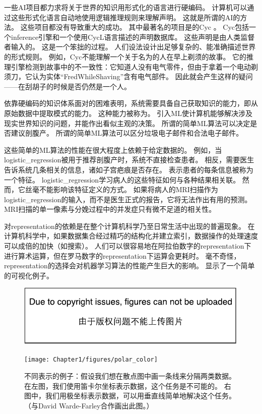 一些\gls{AI}项目都力求将关于世界的知识用形式化的语言进行硬编码。
计算机可以通过这些形式化语言自动地使用逻辑推理规则来理解声明。
这就是所谓的\gls{AI}的方法。
这些项目都没有导致重大的成功。
其中最著名的项目是的Cyc \citep{Lenat-1989-book}。
Cyc包括一个\gls{inference}引擎和一个使用CycL语言描述的声明数据库。
这些声明是由人类监督者输入的。
这是一个笨拙的过程。
人们设法设计出足够复杂的、能准确描述世界的形式规则。
例如，Cyc不能理解一个关于名为的人在早上剃须的故事\citep{MachineChangedWorld}。
它的推理引擎检测到故事中的不一致性：它知道人没有电气零件，但由于拿着一个电动剃须刀，它认为实体``FredWhileShaving''含有电气部件。
因此就会产生这样的疑问——在刮胡子的时候是否仍然是一个人。

依靠硬编码的知识体系面对的困难表明，系统需要具备自己获取知识的能力，即从原始数据中提取模式的能力。
这种能力被称为。
引入\gls{ML}使计算机能够解决涉及现实世界知识的问题，并能作出看似主观的决策。
所谓的简单\gls{ML}算法可以决定是否建议剖腹产\citep{MorYosef90}。
所谓的简单\gls{ML}算法可以区分垃圾电子邮件和合法电子邮件。


这些简单的\gls{ML}算法的性能在很大程度上依赖于给定数据的。
例如，当\gls{logistic_regression}被用于推荐剖腹产时，系统不直接检查患者。
相反，需要医生告诉系统几条相关的信息，诸如子宫疤痕是否存在。
表示患者的每条信息被称为一个特征。
\gls{logistic_regression}学习病人的这些特征如何与各种结果相关联。
然而，它丝毫不能影响该特征定义的方式。
如果将病人的MRI扫描作为\gls{logistic_regression}的输入，而不是医生正式的报告，它将无法作出有用的预测。
MRI扫描的单一像素与分娩过程中的并发症只有微不足道的相关性。

对\gls{representation}的依赖是在整个计算机科学乃至日常生活中出现的普遍现象。
在计算机科学中，如果数据集合经过精巧的结构化并建立索引，数据操作的处理速度可以成倍的加快（如搜索）。
人们可以很容易地在阿拉伯数字的\gls{representation}下进行算术运算，但在罗马数字的\gls{representation}下运算会更耗时。
毫不奇怪，\gls{representation}的选择会对机器学习算法的性能产生巨大的影响。
显示了一个简单的可视化例子。
\begin{figure}[!htb]
\ifOpenSource
\centerline{\includegraphics{figure.pdf}}
\else
\centerline{\texttt{[image: Chapter1/figures/polar\_color]}}
\fi
\caption{不同表示的例子：假设我们想在散点图中画一条线来分隔两类数据。
在左图，我们使用笛卡尔坐标表示数据，这个任务是不可能的。 
右图中，我们用极坐标表示数据，可以用垂直线简单地解决这个任务。（与David Warde-Farley合作画出此图。）}
\label{fig:chap1_polar}
\end{figure}

